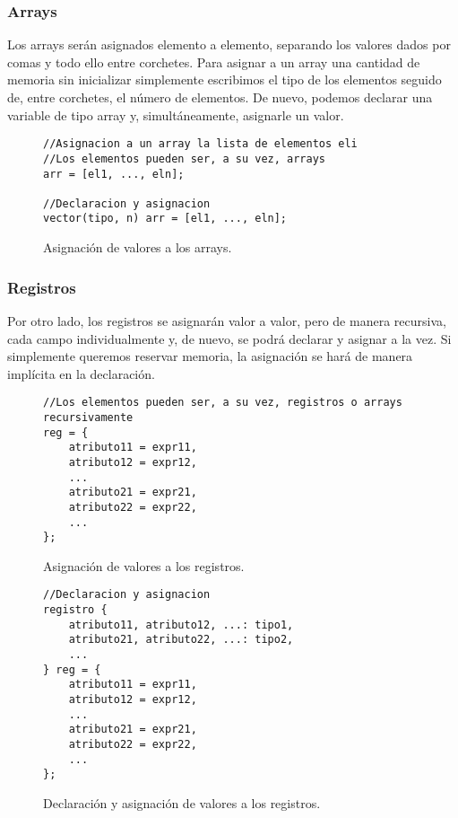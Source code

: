 \subsubsection{Arrays}
Los arrays serán asignados elemento a elemento, separando los valores dados por
comas y todo ello entre corchetes. Para asignar a un array una cantidad de
memoria sin inicializar simplemente escribimos el tipo de los elementos seguido
de, entre corchetes, el número de elementos. De nuevo, podemos declarar una
variable de tipo array y, simultáneamente, asignarle un valor.
\begin{figure}[htbp]
    \centering
    \begin{lstlisting}
//Asignacion a un array la lista de elementos eli
//Los elementos pueden ser, a su vez, arrays
arr = [el1, ..., eln];

//Declaracion y asignacion
vector(tipo, n) arr = [el1, ..., eln];
    \end{lstlisting}
    \caption{Asignación de valores a los arrays.}
\end{figure}

\subsubsection{Registros}
Por otro lado, los registros se asignarán valor a valor, pero de manera
recursiva, cada campo individualmente y, de nuevo, se podrá declarar y asignar a
la vez. Si simplemente queremos reservar memoria, la asignación se hará de
manera implícita en la declaración.
\begin{figure}[htbp]
    \centering
    \begin{lstlisting}
//Los elementos pueden ser, a su vez, registros o arrays recursivamente
reg = {
    atributo11 = expr11,
    atributo12 = expr12,
    ...
    atributo21 = expr21,
    atributo22 = expr22,
    ...
};
    \end{lstlisting}
    \caption{Asignación de valores a los registros.}
\end{figure}

\begin{figure}[htbp]
    \centering
    \begin{lstlisting}
//Declaracion y asignacion
registro {
    atributo11, atributo12, ...: tipo1,
    atributo21, atributo22, ...: tipo2,
    ...
} reg = {
    atributo11 = expr11,
    atributo12 = expr12,
    ...
    atributo21 = expr21,
    atributo22 = expr22,
    ...
};
    \end{lstlisting}
    \caption{Declaración y asignación de valores a los registros.}
\end{figure}

